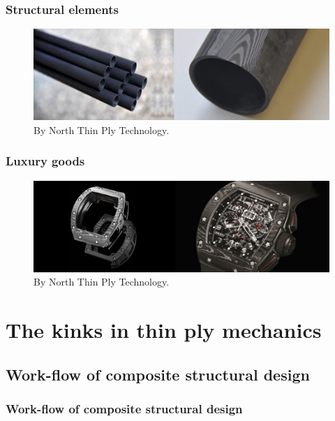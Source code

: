 \documentclass[first,firstsupp,lastsupp,handout,last,hyperref,table]{ETHclass}
\begin{document}
\begin{frame}
\frametitle{Structural elements}
\centering
\begin{figure}[!h]
\centering
  \includegraphics[width=\textwidth]{ntpt_tubes.jpg}%
  \caption{\scriptsize By North Thin Ply Technology.}
  \label{fig:ntpt_tubes}
  \end{figure}
\end{frame}



\begin{frame}
\frametitle{Luxury goods}
\centering
\begin{figure}[!h]
\centering
    \includegraphics[width=\textwidth]{ntpt_luxurywatch.jpg}%
  \caption{\scriptsize By North Thin Ply Technology.}
  \label{fig:ntpt_luxury}
\end{figure}
\end{frame}

\section{The kinks in thin ply mechanics}

\subsection{Work-flow of composite structural design}

\begin{frame}
\frametitle{Work-flow of composite structural design}
\vspace{-0.75cm}
\centering
\begin{figure}
\centering

\label{fig:design_workflow}
\end{figure}
\end{frame}
\end{document}
